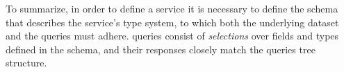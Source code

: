 
To summarize,
in order to define a \gql service it is necessary to define the schema that describes the service's type system, 
to which both the underlying dataset and the queries must adhere. \gql queries consist of {\em selections} over fields and types defined in the schema, and their responses closely match the queries tree structure.
